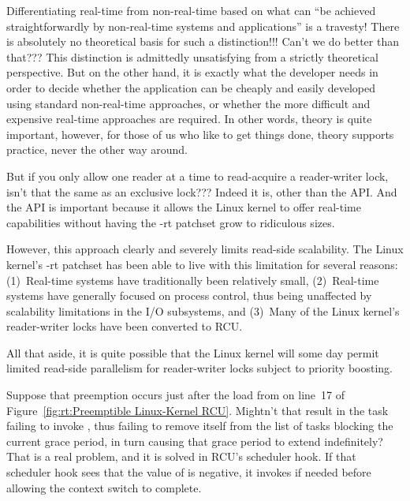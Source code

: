 \begin{enumerate}
\QuickQ{}
	Differentiating real-time from non-real-time based on what can
	``be achieved straightforwardly by non-real-time systems and
	applications'' is a travesty!
	There is absolutely no theoretical basis for such a distinction!!!
	Can't we do better than that???
\QuickA{}
	This distinction is admittedly unsatisfying from a strictly
	theoretical perspective.
	But on the other hand, it is exactly what the developer needs
	in order to decide whether the application can be cheaply and
	easily developed using standard non-real-time approaches, or
	whether the more difficult and expensive real-time approaches
	are required.
	In other words, theory is quite important, however, for those
	of us who like to get things done, theory supports practice,
	never the other way around.

\QuickQ{}
	But if you only allow one reader at a time to read-acquire
	a reader-writer lock, isn't that the same as an exclusive
	lock???
\QuickA{}
	Indeed it is, other than the API.
	And the API is important because it allows the Linux kernel
	to offer real-time capabilities without having the -rt patchset
	grow to ridiculous sizes.

	However, this approach clearly and severely limits read-side
	scalability.
	The Linux kernel's -rt patchset has been able to live with this
	limitation for several reasons: (1)~Real-time systems have
	traditionally been relatively small, (2)~Real-time systems
	have generally focused on process control, thus being unaffected
	by scalability limitations in the I/O subsystems, and
	(3)~Many of the Linux kernel's reader-writer locks have been
	converted to RCU.

	All that aside, it is quite possible that the Linux kernel
	will some day permit limited read-side parallelism for
	reader-writer locks subject to priority boosting.

\QuickQ{}
	Suppose that preemption occurs just after the load from
	 on line~17 of
	Figure~\ref{fig:rt:Preemptible Linux-Kernel RCU}.
	Mightn't that result in the task failing to invoke
	, thus failing to remove itself
	from the list of tasks blocking the current grace period,
	in turn causing that grace period to extend indefinitely?
\QuickA{}
	That is a real problem, and it is solved in RCU's scheduler hook.
	If that scheduler hook sees that the value of
	 is negative, it invokes
	 if needed before allowing
	the context switch to complete.


\end{enumerate}
